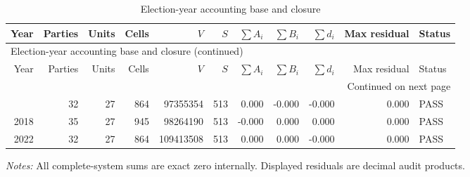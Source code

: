 \begingroup
\scriptsize
\setlength{\tabcolsep}{3.2pt}
\begin{longtable}{rrrrrrrrrrl}
\caption{Election-year accounting base and closure}\label{tab:intermediate-year-closure} \\
\toprule
Year & Parties & Units & Cells & \(V\) & \(S\) & \(\sum A_i\) & \(\sum B_i\) & \(\sum d_i\) & Max residual & Status \\
\midrule
\endfirsthead
\multicolumn{11}{l}{\footnotesize Election-year accounting base and closure (continued)} \\
\toprule
Year & Parties & Units & Cells & \(V\) & \(S\) & \(\sum A_i\) & \(\sum B_i\) & \(\sum d_i\) & Max residual & Status \\
\midrule
\endhead
\midrule
\multicolumn{11}{r}{\footnotesize Continued on next page} \\
\endfoot
\bottomrule
\endlastfoot
2014 & 32 & 27 & 864 & 97355354 & 513 & 0.000 & -0.000 & -0.000 & 0.000 & PASS \\
2018 & 35 & 27 & 945 & 98264190 & 513 & -0.000 & 0.000 & 0.000 & 0.000 & PASS \\
2022 & 32 & 27 & 864 & 109413508 & 513 & 0.000 & 0.000 & -0.000 & 0.000 & PASS \\
\end{longtable}
\noindent\footnotesize\textit{Notes:} All complete-system sums are exact zero internally. Displayed residuals are decimal audit products.
\endgroup
